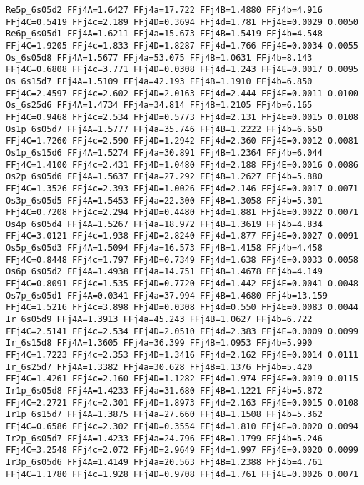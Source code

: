 {\begin{verbatim}
Re5p_6s05d2 FFj4A=1.6427 FFj4a=17.722 FFj4B=1.4880 FFj4b=4.916 FFj4C=0.5419 FFj4c=2.189 FFj4D=0.3694 FFj4d=1.781 FFj4E=0.0029 0.0050 
Re6p_6s05d1 FFj4A=1.6211 FFj4a=15.673 FFj4B=1.5419 FFj4b=4.548 FFj4C=1.9205 FFj4c=1.833 FFj4D=1.8287 FFj4d=1.766 FFj4E=0.0034 0.0055 
Os_6s05d8 FFj4A=1.5677 FFj4a=53.075 FFj4B=1.0631 FFj4b=8.143 FFj4C=0.6808 FFj4c=3.771 FFj4D=0.0308 FFj4d=1.243 FFj4E=0.0017 0.0095 
Os_6s15d7 FFj4A=1.5109 FFj4a=42.193 FFj4B=1.1910 FFj4b=6.850 FFj4C=2.4597 FFj4c=2.602 FFj4D=2.0163 FFj4d=2.444 FFj4E=0.0011 0.0100 
Os_6s25d6 FFj4A=1.4734 FFj4a=34.814 FFj4B=1.2105 FFj4b=6.165 FFj4C=0.9468 FFj4c=2.534 FFj4D=0.5773 FFj4d=2.131 FFj4E=0.0015 0.0108 
Os1p_6s05d7 FFj4A=1.5777 FFj4a=35.746 FFj4B=1.2222 FFj4b=6.650 FFj4C=1.7260 FFj4c=2.590 FFj4D=1.2942 FFj4d=2.360 FFj4E=0.0012 0.0081 
Os1p_6s15d6 FFj4A=1.5274 FFj4a=30.891 FFj4B=1.2364 FFj4b=6.044 FFj4C=1.4100 FFj4c=2.431 FFj4D=1.0480 FFj4d=2.188 FFj4E=0.0016 0.0086 
Os2p_6s05d6 FFj4A=1.5637 FFj4a=27.292 FFj4B=1.2627 FFj4b=5.880 FFj4C=1.3526 FFj4c=2.393 FFj4D=1.0026 FFj4d=2.146 FFj4E=0.0017 0.0071 
Os3p_6s05d5 FFj4A=1.5453 FFj4a=22.300 FFj4B=1.3058 FFj4b=5.301 FFj4C=0.7208 FFj4c=2.294 FFj4D=0.4480 FFj4d=1.881 FFj4E=0.0022 0.0071 
Os4p_6s05d4 FFj4A=1.5267 FFj4a=18.972 FFj4B=1.3619 FFj4b=4.834 FFj4C=3.0121 FFj4c=1.938 FFj4D=2.8240 FFj4d=1.877 FFj4E=0.0027 0.0091 
Os5p_6s05d3 FFj4A=1.5094 FFj4a=16.573 FFj4B=1.4158 FFj4b=4.458 FFj4C=0.8448 FFj4c=1.797 FFj4D=0.7349 FFj4d=1.638 FFj4E=0.0033 0.0058 
Os6p_6s05d2 FFj4A=1.4938 FFj4a=14.751 FFj4B=1.4678 FFj4b=4.149 FFj4C=0.8091 FFj4c=1.535 FFj4D=0.7720 FFj4d=1.442 FFj4E=0.0041 0.0048 
Os7p_6s05d1 FFj4A=0.0341 FFj4a=37.994 FFj4B=1.4680 FFj4b=13.159 FFj4C=1.5216 FFj4c=3.898 FFj4D=0.0308 FFj4d=0.550 FFj4E=0.0083 0.0044 
Ir_6s05d9 FFj4A=1.3913 FFj4a=45.243 FFj4B=1.0627 FFj4b=6.722 FFj4C=2.5141 FFj4c=2.534 FFj4D=2.0510 FFj4d=2.383 FFj4E=0.0009 0.0099 
Ir_6s15d8 FFj4A=1.3605 FFj4a=36.399 FFj4B=1.0953 FFj4b=5.990 FFj4C=1.7223 FFj4c=2.353 FFj4D=1.3416 FFj4d=2.162 FFj4E=0.0014 0.0111 
Ir_6s25d7 FFj4A=1.3382 FFj4a=30.628 FFj4B=1.1376 FFj4b=5.420 FFj4C=1.4261 FFj4c=2.160 FFj4D=1.1282 FFj4d=1.974 FFj4E=0.0019 0.0115 
Ir1p_6s05d8 FFj4A=1.4233 FFj4a=31.680 FFj4B=1.1221 FFj4b=5.872 FFj4C=2.2721 FFj4c=2.301 FFj4D=1.8973 FFj4d=2.163 FFj4E=0.0015 0.0108 
Ir1p_6s15d7 FFj4A=1.3875 FFj4a=27.660 FFj4B=1.1508 FFj4b=5.362 FFj4C=0.6586 FFj4c=2.302 FFj4D=0.3554 FFj4d=1.810 FFj4E=0.0020 0.0094 
Ir2p_6s05d7 FFj4A=1.4233 FFj4a=24.796 FFj4B=1.1799 FFj4b=5.246 FFj4C=3.2548 FFj4c=2.072 FFj4D=2.9649 FFj4d=1.997 FFj4E=0.0020 0.0099 
Ir3p_6s05d6 FFj4A=1.4149 FFj4a=20.563 FFj4B=1.2388 FFj4b=4.761 FFj4C=1.1780 FFj4c=1.928 FFj4D=0.9708 FFj4d=1.761 FFj4E=0.0026 0.0071 

\end{verbatim}}
